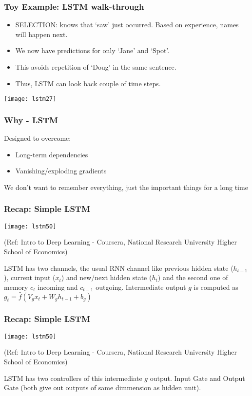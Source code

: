 \begin{frame}[fragile] \frametitle{Toy Example: LSTM walk-through}
\begin{itemize}
\item SELECTION: knows that `saw' just occurred. Based on experience, names will happen next.
\item We now have predictions for only `Jane' and `Spot'.
\item This avoids repetition of `Doug' in the same sentence.
\item Thus, LSTM can look back couple of time steps.
\end{itemize}
\begin{center}
\texttt{[image: lstm27]}
\end{center}
\end{frame}



\begin{frame}[fragile] \frametitle{Why - LSTM}
Designed to overcome:
\begin{itemize}
\item Long-term dependencies
\item Vanishing/exploding gradients
\end{itemize}
We don't want  to remember  everything,  just  the  important  things  for a long time
\end{frame}

\begin{frame}[fragile] \frametitle{Recap: Simple LSTM}
\begin{center}
\texttt{[image: lstm50]}

\tiny{(Ref: Intro to Deep Learning - Coursera, National Research University Higher School of Economics)}
\end{center}
LSTM has two channels, the usual RNN channel like previous hidden state ($h_{t-1}$), current input ($x_t$) and new/next hidden state ($h_t$) and the second one of memory $c_t$ incoming and $c_{t-1}$ outgoing. Intermediate output $g$ is computed as $g_t = \hat{f} ( V_gx_t + W_gh_{t-1} + b_g)$
\end{frame}

\begin{frame}[fragile] \frametitle{Recap: Simple LSTM}
\begin{center}
\texttt{[image: lstm50]}

\tiny{(Ref: Intro to Deep Learning - Coursera, National Research University Higher School of Economics)}
\end{center}
LSTM has two controllers of this intermediate $g$ output. Input Gate and Output Gate (both give out outputs of same dimmension as hidden unit).
\end{frame}

